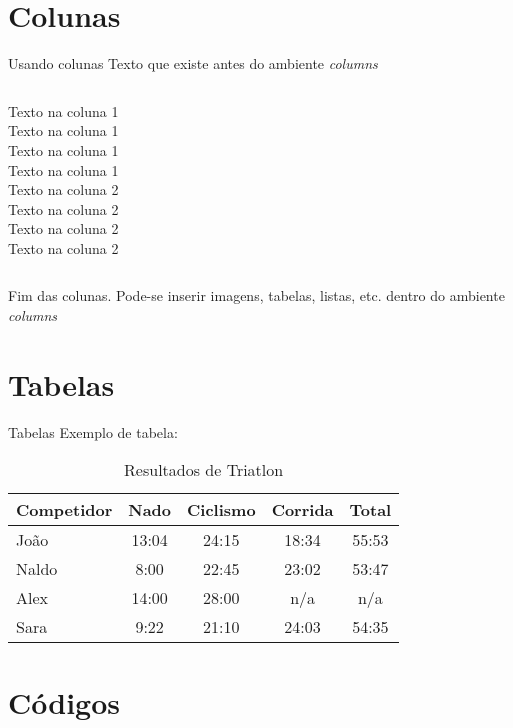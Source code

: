 \documentclass[darkblue]{beamer}
\begin{document}
		\section{Colunas}
			\begin{frame}{Usando colunas}
				Texto que existe antes do ambiente \textit{columns}
				
				\vspace*{5mm}
				
				\begin{columns}
					Texto na coluna 1\\
					Texto na coluna 1\\
					Texto na coluna 1\\
					Texto na coluna 1\\
					
					Texto na coluna 2\\
					Texto na coluna 2\\
					Texto na coluna 2\\
					Texto na coluna 2
				\end{columns}
				
				\vspace*{5mm}
				
				Fim das colunas. Pode-se inserir imagens, tabelas, listas, etc. dentro do ambiente \textit{columns}
			\end{frame}
		
		\section{Tabelas}
			\begin{frame}{Tabelas}
				Exemplo de tabela:
				\begin{table}
					\begin{tabular}{l | c | c | c | c }
						Competidor & Nado & Ciclismo & Corrida & Total \\
						\hline \hline
						João & 13:04 & 24:15 & 18:34 & 55:53 \\ 
						Naldo & 8:00 & 22:45 & 23:02 & 53:47\\
						Alex & 14:00 & 28:00 & n/a & n/a\\
						Sara & 9:22 & 21:10 & 24:03 & 54:35 
					\end{tabular}
					\caption{Resultados de Triatlon}
				\end{table}
			\end{frame}
			
		\section{Códigos}
\end{document}
